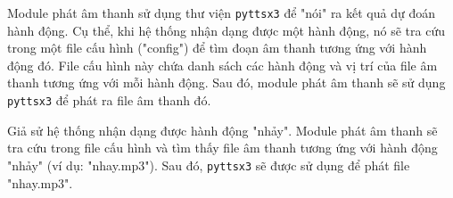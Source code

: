 Module phát âm thanh sử dụng thư viện \texttt{pyttsx3} để "nói" ra kết quả dự đoán hành động. Cụ thể, khi hệ thống nhận dạng được một hành động, nó sẽ tra cứu trong một file cấu hình ("config") để tìm đoạn âm thanh tương ứng với hành động đó. File cấu hình này chứa danh sách các hành động và vị trí của file âm thanh tương ứng với mỗi hành động. Sau đó, module phát âm thanh sẽ sử dụng \texttt{pyttsx3} để phát ra file âm thanh đó.


Giả sử hệ thống nhận dạng được hành động "nhảy". Module phát âm thanh sẽ tra cứu trong file cấu hình và tìm thấy file âm thanh tương ứng với hành động "nhảy" (ví dụ: "nhay.mp3"). Sau đó, \texttt{pyttsx3} sẽ được sử dụng để phát file "nhay.mp3".
 

